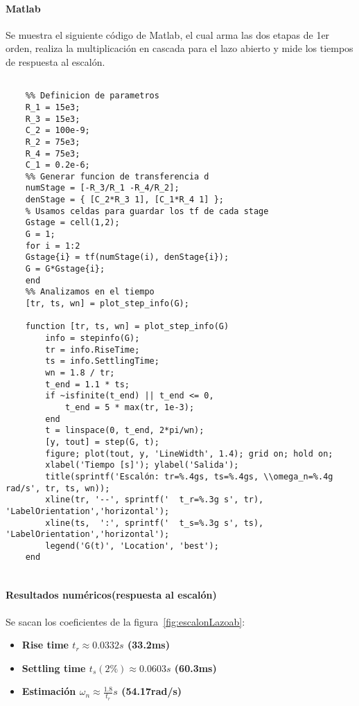 \paragraph{Matlab} Se muestra el siguiente código de Matlab, el cual arma las dos etapas de 1er orden, realiza la multiplicación en cascada para el lazo abierto y mide los tiempos de respuesta al escalón.

\onecolumn

\begin{lstlisting}[style=matlabstyle,caption={Script en Matlab},label={lst:mat}]
	
	%% Definicion de parametros
	R_1 = 15e3;
	R_3 = 15e3;
	C_2 = 100e-9;
	R_2 = 75e3;
	R_4 = 75e3;
	C_1 = 0.2e-6;
	%% Generar funcion de transferencia d
	numStage = [-R_3/R_1 -R_4/R_2];
	denStage = { [C_2*R_3 1], [C_1*R_4 1] };
	% Usamos celdas para guardar los tf de cada stage
	Gstage = cell(1,2);
	G = 1;
	for i = 1:2
	Gstage{i} = tf(numStage(i), denStage{i});
	G = G*Gstage{i};
	end
	%% Analizamos en el tiempo
	[tr, ts, wn] = plot_step_info(G);
	
	function [tr, ts, wn] = plot_step_info(G)
		info = stepinfo(G);
		tr = info.RiseTime;
		ts = info.SettlingTime;
		wn = 1.8 / tr;
		t_end = 1.1 * ts;
		if ~isfinite(t_end) || t_end <= 0, 
			t_end = 5 * max(tr, 1e-3); 
		end
		t = linspace(0, t_end, 2*pi/wn);
		[y, tout] = step(G, t);
		figure; plot(tout, y, 'LineWidth', 1.4); grid on; hold on;
		xlabel('Tiempo [s]'); ylabel('Salida');
		title(sprintf('Escalón: tr=%.4gs, ts=%.4gs, \\omega_n=%.4g rad/s', tr, ts, wn));
		xline(tr, '--', sprintf('  t_r=%.3g s', tr), 'LabelOrientation','horizontal');
		xline(ts,  ':', sprintf('  t_s=%.3g s', ts), 'LabelOrientation','horizontal');
		legend('G(t)', 'Location', 'best');
	end
	
\end{lstlisting}
\twocolumn
{}
\paragraph{Resultados numéricos(respuesta al escalón)} Se sacan los coeficientes de la figura~\ref{fig:escalonLazoab}:
\begin{itemize}
	\item \textbf{Rise time $t_r \approx 0.0332 s$ (33.2ms)}
	\item \textbf{Settling time $t_s(2\%) \approx 0.0603 s$ (60.3ms)}
	\item \textbf{Estimación $\omega_n \approx \frac{1.8}{t_r} s$ (54.17rad/s)}
\end{itemize}



